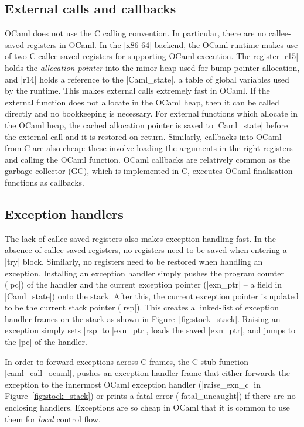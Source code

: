 \documentclass[sigplan,screen]{acmart}
\begin{document}
\subsection{External calls and callbacks}
\label{sec:external}

OCaml does not use the C calling convention. In particular, there are no
callee-saved registers in OCaml. In the |x86-64| backend, the OCaml runtime
makes use of two C callee-saved registers for supporting OCaml execution. The
register |r15| holds the \emph{allocation pointer} into the minor heap used for
bump pointer allocation, and |r14| holds a reference to the |Caml_state|, a
table of global variables used by the runtime. This makes external calls
extremely fast in OCaml. If the external function does not allocate in the
OCaml heap, then it can be called directly and no bookkeeping is necessary. For
external functions which allocate in the OCaml heap, the cached allocation
pointer is saved to |Caml_state| before the external call and it is restored on
return. Similarly, callbacks into OCaml from C are also cheap: these involve
loading the arguments in the right registers and calling the OCaml function.
OCaml callbacks are relatively common as the garbage collector (GC), which is
implemented in C, executes OCaml finalisation functions as callbacks.

\subsection{Exception handlers}
\label{sec:exn_handlers}

The lack of callee-saved registers also makes exception handling fast. In the
absence of callee-saved registers, no registers need to be saved when entering
a |try| block. Similarly, no registers need to be restored when handling an
exception. Installing an exception handler simply pushes the program counter
(|pc|) of the handler and the current exception pointer (|exn_ptr| -- a field
in |Caml_state|) onto the stack. After this, the current exception pointer is
updated to be the current stack pointer (|rsp|). This creates a linked-list of
exception handler frames on the stack as shown in Figure~\ref{fig:stock_stack}.
Raising an exception simply sets |rsp| to |exn_ptr|, loads the saved |exn_ptr|,
and jumps to the |pc| of the handler.

In order to forward exceptions across C frames, the C stub function
|caml_call_ocaml|, pushes an exception handler frame that either forwards the
exception to the innermost OCaml exception handler (|raise_exn_c| in
Figure~\ref{fig:stock_stack}) or prints a fatal error (|fatal_uncaught|) if
there are no enclosing handlers. Exceptions are so cheap in OCaml that it is
common to use them for \emph{local} control flow.
\end{document}
